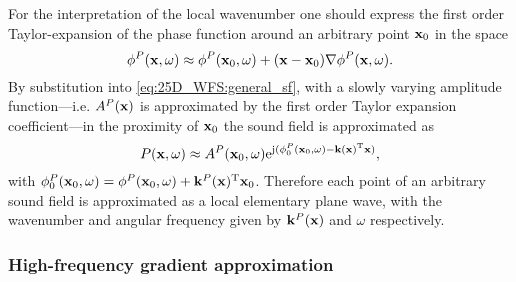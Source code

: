 For the interpretation of the local wavenumber one should express the first order Taylor-expansion of the phase function around an arbitrary point $\mathbf{x}_0$ in the space
\begin{equation}
\phi^P(\mathbf{x},\omega) \approx \phi^P(\mathbf{x}_0,\omega) + (\mathbf{x}-\mathbf{x}_0) \nabla \phi^P(\mathbf{x},\omega).
\end{equation}
By substitution into \eqref{eq:25D_WFS:general_sf}, with a slowly varying amplitude function---i.e. $A^P(\mathbf{x})$ is approximated by the first order Taylor expansion coefficient---in the proximity of $\mathbf{x}_0$ the sound field is approximated as
\begin{equation}
\label{Eq:25D_WFS:plane_wave_approximation}
P(\mathbf{x},\omega) \approx A^P(\mathbf{x}_0,\omega) \mathrm{e}^{\mathrm{j} ( \phi_0^P(\mathbf{x}_0,\omega) - \mathbf{k}(\mathbf{x})^{\mathrm{T}} \mathbf{x} )},
\end{equation}
with $\phi_0^P(\mathbf{x}_0,\omega) = \phi^P(\mathbf{x}_0,\omega) + \mathbf{k}^P(\mathbf{x})^{\mathrm{T}} \mathbf{x}_0 $.
Therefore each point of an arbitrary sound field is approximated as a local elementary plane wave, with the wavenumber and angular frequency given by $\mathbf{k}^P(\mathbf{x})$ and $\omega$ respectively.

\subsubsection{High-frequency gradient approximation}

